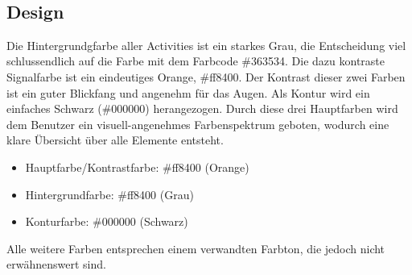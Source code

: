 \documentclass[FIPLY_base.tex]{subfiles}
\begin{document}
	\ \\
	\subsection{Design}
	Die Hintergrundgfarbe aller Activities ist ein starkes Grau, die Entscheidung viel schlussendlich auf die Farbe mit dem Farbcode \#363534. Die dazu kontraste Signalfarbe ist ein eindeutiges Orange, \#ff8400. Der Kontrast dieser zwei Farben ist ein guter Blickfang und angenehm für das Augen. Als Kontur wird ein einfaches Schwarz (\#000000) herangezogen. Durch diese drei Hauptfarben wird dem Benutzer ein visuell-angenehmes Farbenspektrum geboten, wodurch eine klare Übersicht über alle Elemente entsteht.
	\begin{itemize}
	 	\item Hauptfarbe/Kontrastfarbe: \#ff8400 (Orange)
	 	\item Hintergrundfarbe: \#ff8400 (Grau)
	 	\item Konturfarbe: \#000000 (Schwarz)
	\end{itemize}
	Alle weitere Farben entsprechen einem verwandten Farbton, die jedoch nicht erwähnenswert sind.
	
\end{document}
